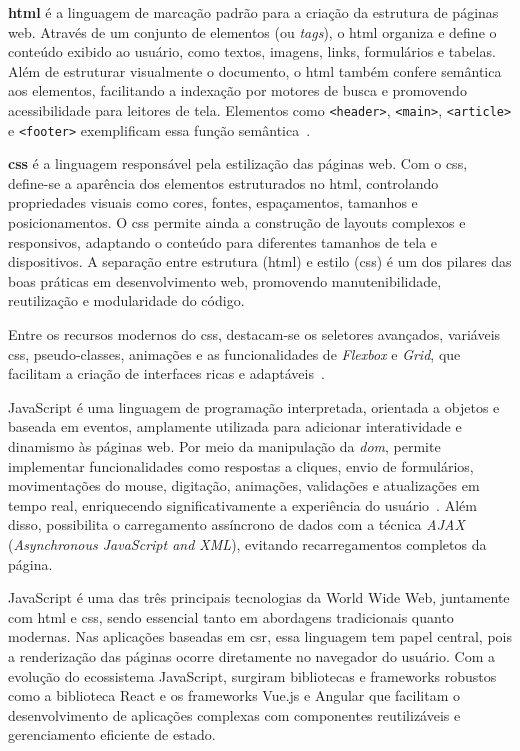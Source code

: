 \textbf{\acrfull{html}} é a linguagem de marcação padrão para a criação da estrutura de páginas web. Através de um conjunto de elementos (ou \textit{tags}), o \acrshort{html} organiza e define o conteúdo exibido ao usuário, como textos, imagens, links, formulários e tabelas. Além de estruturar visualmente o documento, o \acrshort{html} também confere semântica aos elementos, facilitando a indexação por motores de busca e promovendo acessibilidade para leitores de tela. Elementos como \texttt{<header>}, \texttt{<main>}, \texttt{<article>} e \texttt{<footer>} exemplificam essa função semântica~\cite{alura_htmlcssjs}.

\textbf{\acrfull{css}} é a linguagem responsável pela estilização das páginas web. Com o \acrshort{css}, define-se a aparência dos elementos estruturados no \acrshort{html}, controlando propriedades visuais como cores, fontes, espaçamentos, tamanhos e posicionamentos. O \acrshort{css} permite ainda a construção de layouts complexos e responsivos, adaptando o conteúdo para diferentes tamanhos de tela e dispositivos. A separação entre estrutura (\acrshort{html}) e estilo (\acrshort{css}) é um dos pilares das boas práticas em desenvolvimento web, promovendo manutenibilidade, reutilização e modularidade do código.

Entre os recursos modernos do \acrshort{css}, destacam-se os seletores avançados, variáveis \acrshort{css}, pseudo-classes, animações e as funcionalidades de \textit{Flexbox} e \textit{Grid}, que facilitam a criação de interfaces ricas e adaptáveis~\cite{herocode_diferencas}.

JavaScript é uma linguagem de programação interpretada, orientada a objetos e baseada em eventos, amplamente utilizada para adicionar interatividade e dinamismo às páginas web. Por meio da manipulação da \textit{\acrfull{dom}}, permite implementar funcionalidades como respostas a cliques, envio de formulários, movimentações do mouse, digitação, animações, validações e atualizações em tempo real, enriquecendo significativamente a experiência do usuário~\cite{alura_htmlcssjs}. Além disso, possibilita o carregamento assíncrono de dados com a técnica \textit{AJAX} (\textit{Asynchronous JavaScript and XML}), evitando recarregamentos completos da página.

JavaScript é uma das três principais tecnologias da World Wide Web, juntamente com \acrshort{html} e \acrshort{css}, sendo essencial tanto em abordagens tradicionais quanto modernas. Nas aplicações baseadas em \acrshort{csr}, essa linguagem tem papel central, pois a renderização das páginas ocorre diretamente no navegador do usuário. Com a evolução do ecossistema JavaScript, surgiram bibliotecas e frameworks robustos como a biblioteca React e os frameworks Vue.js e Angular que facilitam o desenvolvimento de aplicações complexas com componentes reutilizáveis e gerenciamento eficiente de estado.

